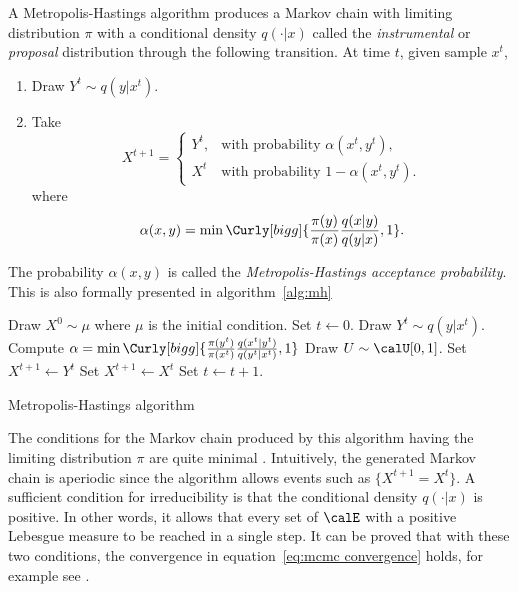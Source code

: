 A Metropolis-Hastings algorithm produces a Markov chain with limiting
distribution $\pi$ with a conditional density $q(\cdot|x)$ called the
\emph{instrumental} or \emph{proposal} distribution through the following
transition. At time $t$, given sample $x^t$,
\begin{enumerate}
  \item Draw $Y^t \sim q(y|x^t)$.
  \item Take
    \begin{equation*}
      X^{t+1} =
      \begin{cases}
        Y^t, &\text{with probability } \alpha(x^t,y^t),\\
        X^t  &\text{with probability } 1 - \alpha(x^t,y^t).
      \end{cases}
    \end{equation*}
    where
    \begin{equation}
      \alpha(x,y) =
      \min\Curly[bigg]{\frac{\pi(y)}{\pi(x)}\frac{q(x|y)}{q(y|x)},1}.
    \end{equation}
\end{enumerate}
The probability $\alpha(x,y)$ is called the \emph{Metropolis-Hastings
  acceptance probability}. This is also formally presented in
algorithm~\ref{alg:mh}

\begin{algorithm}
\begin{algorithmic}
  \tophrule
  \STATE Draw $X^0\sim\mu$ where $\mu$ is the initial condition.
  \STATE Set $t\leftarrow0$.
  \REPEAT
    \STATE Draw $Y^t\sim q(y|x^t)$.
    \STATE Compute $\alpha = \min\Curly[bigg]{
      \frac{\pi(y^t)}{\pi(x^t)}\frac{q(x^t|y^t)}{q(y^t|x^t)}, 1}$
    \STATE Draw $U\sim\calU[0,1]$.
      \STATE Set $X^{t+1}\leftarrow Y^t$
    \ELSE
      \STATE Set $X^{t+1}\leftarrow X^t$
    \ENDIF
    \STATE Set $t\leftarrow t+1$.
  \bottomhrule
\end{algorithmic}
\caption{Metropolis-Hastings algorithm}
\label{alg:mh}
\end{algorithm}

The conditions for the Markov chain produced by
this algorithm having the limiting distribution $\pi$ are quite minimal
\cite[][sec.~7.3.2]{Robert:2004tn}. Intuitively, the generated Markov chain is
aperiodic since the algorithm allows events such as $\{X^{t+1} = X^t\}$. A
sufficient condition for irreducibility is that the conditional density
$q(\cdot|x)$ is positive. In other words, it allows that every set of $\calE$
with a positive Lebesgue measure to be reached in a single step. It can be
proved that with these two conditions, the convergence in
equation~\eqref{eq:mcmc convergence} holds, for example see
\cite[][Theorem~7.4 and Corollary~7.5]{Robert:2004tn}.

